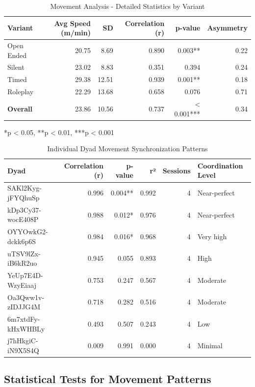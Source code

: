\begin{table}[H]
\centering
\caption{Movement Analysis - Detailed Statistics by Variant}
\label{tab:movement_complete_stats}
\begin{tabular}{lrrrrr}
\toprule
\textbf{Variant} & \textbf{Avg Speed (m/min)} & \textbf{SD} & \textbf{Correlation (r)} & \textbf{p-value} & \textbf{Asymmetry} \\
\midrule
Open Ended & 20.75 & 8.69 & 0.890 & 0.003** & 0.22 \\
Silent & 23.02 & 8.83 & 0.351 & 0.394 & 0.24 \\
Timed & 29.38 & 12.51 & 0.939 & 0.001** & 0.18 \\
Roleplay & 22.29 & 13.68 & 0.658 & 0.076 & 0.71 \\
\midrule
\textbf{Overall} & 23.86 & 10.56 & 0.737 & < 0.001*** & 0.34 \\
\bottomrule
\end{tabular}
\small
*p < 0.05, **p < 0.01, ***p < 0.001
\end{table}

\begin{table}[H]
\centering
\caption{Individual Dyad Movement Synchronization Patterns}
\label{tab:dyad_movement_complete}
\begin{tabular}{lrrrrl}
\toprule
\textbf{Dyad} & \textbf{Correlation (r)} & \textbf{p-value} & \textbf{r²} & \textbf{Sessions} & \textbf{Coordination Level} \\
\midrule
SAKl2Kyg-jFYQhuSp & 0.996 & 0.004** & 0.992 & 4 & Near-perfect \\
kDp3Cy37-wocE408P & 0.988 & 0.012* & 0.976 & 4 & Near-perfect \\
OYYOwkG2-dckk6p6S & 0.984 & 0.016* & 0.968 & 4 & Very high \\
uTSV9lZx-iB6kR2uo & 0.945 & 0.055 & 0.893 & 4 & High \\
YeUp7E4D-WzyEiaaj & 0.753 & 0.247 & 0.567 & 4 & Moderate \\
Oa3Qww1v-zIDJJG4M & 0.718 & 0.282 & 0.516 & 4 & Moderate \\
6m7xtdFy-kHxWHBLy & 0.493 & 0.507 & 0.243 & 4 & Low \\
j7hHkgiC-iN9X5S4Q & 0.009 & 0.991 & 0.000 & 4 & Minimal \\
\bottomrule
\end{tabular}
\end{table}

\subsection{Statistical Tests for Movement Patterns}
\label{appendix:movement_communication}

